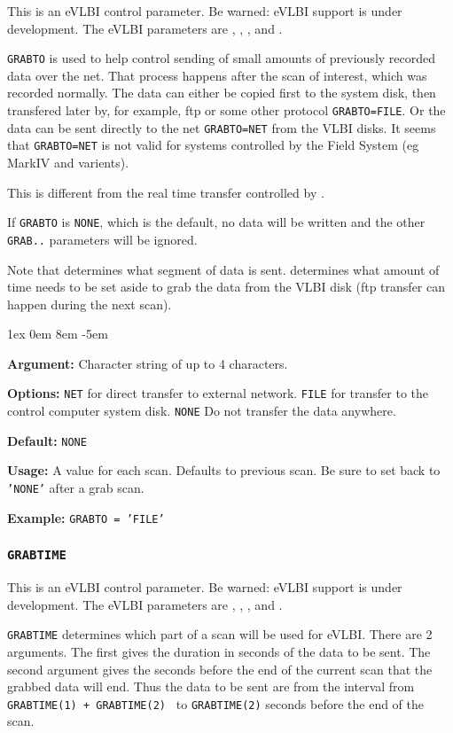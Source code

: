 \documentclass{report}
\newcommand{\rcwbox}[5]{
  \begin{list}{}{\parsep 1ex  \itemsep 0em
                 \leftmargin 8em  \itemindent -5em }
    \item {\bf Argument:} #1
    \item {\bf Options:}  #2
    \item {\bf Default:}  #3
    \item {\bf Usage:}    #4
    \item {\bf Example:}  #5
  \end{list}
}
\begin{document}
This is an eVLBI control parameter.  Be warned: eVLBI support is
under development.
The eVLBI parameters are ,
, ,
and .

{\tt GRABTO} is used to help control sending of small amounts of
previously recorded data over the net.  That process happens after the
scan of interest, which was recorded normally.  The data can either be
copied first to the system disk, then transfered later by, for
example, ftp or some other protocol {\tt GRABTO=FILE}.  Or the data
can be sent directly to the net {\tt GRABTO=NET} from the VLBI disks.
It seems that {\tt GRABTO=NET} is not valid for systems controlled by
the Field System (eg MarkIV and varients).

This is different from the real time transfer controlled by
.

If {\tt GRABTO} is {\tt NONE}, which is the default, no data will be
written and the other {\tt GRAB..} parameters will be ignored.

Note that  determines what
segment of data is sent.   determines
what amount of time needs to be set aside to grab the data from the
VLBI disk (ftp transfer can happen during the next scan).

\rcwbox
{ Character string of up to 4 characters.}
{{\tt NET} for direct transfer to external network.
 {\tt FILE} for transfer to the control computer system disk.
 {\tt NONE} Do not transfer the data anywhere.}
{{\tt NONE}}
{A value for each scan.  Defaults to previous scan.  Be sure to set
back to {\tt 'NONE'} after a grab scan.}
{{\tt GRABTO = 'FILE' }}

\subsubsection{\label{MP:GRABTIME}{\tt GRABTIME}}

This is an eVLBI control parameter.  Be warned: eVLBI support is
under development.
The eVLBI parameters are ,
, ,
and .

{\tt GRABTIME} determines which part of a scan will be used for
eVLBI.  There are 2 arguments.  The first gives the duration in
seconds of the data to be sent.  The second argument gives the
seconds before the end of the current scan that the grabbed data
will end.  Thus the data to be sent are from the interval from
{\tt GRABTIME(1) + GRABTIME(2) } to {\tt GRABTIME(2)} seconds
before the end of the scan.
\end{document}
